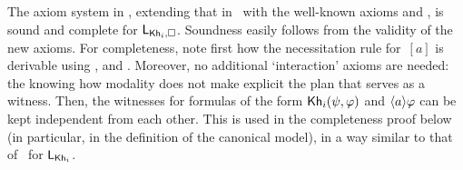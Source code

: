 
The axiom system in , extending that in~ with the well-known axioms  and , is sound and complete for $\mathsf{L}_{{\sf Kh}_i,\square}$. Soundness easily follows from the validity of the new axioms. For completeness, note first how the necessitation rule for~$[a]$ is derivable using ,  and . Moreover, no additional `interaction' axioms are needed: the knowing how modality does not make explicit the plan that serves as a witness. Then, the witnesses for formulas of the form ${\sf Kh}_i(\psi,\varphi)$ and $\langle a \rangle\varphi$ can be kept independent from each other. 
This is used in the completeness proof below (in particular, in the definition of the canonical model), in a way similar to that of~\cite{AFSVQ21,AFSVQ23report} for $\mathsf{L}_{{\sf Kh}_i}$.
\medskip








